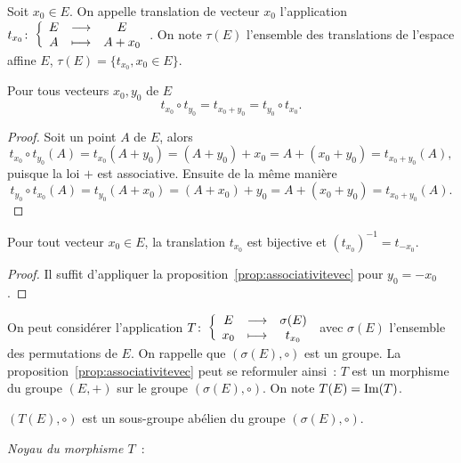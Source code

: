 \begin{defdef}
  Soit $x_0 \in E$. On appelle translation de vecteur $x_0$ l'application $t_{x_0}\colon \left\{\begin{array}{ccc} E & \longrightarrow &E\\ A & \longmapsto & A+x_0 \end{array} \right.$. On note $\tau(E)$ l'ensemble des translations de l'espace affine $E$, $\tau(E)=\{t_{x_0}, x_0 \in E\}$.
\end{defdef}

\begin{prop}\label{prop:associativitevec}
  Pour tous vecteurs $x_0, y_0$ de $E$
  \begin{equation}
    t_{x_0} \circ t_{y_0} = t_{x_0 +y_0} = t_{y_0} \circ t_{x_0}.
  \end{equation}
\end{prop}
\begin{proof}
  Soit un point $A$ de $E$, alors
  \begin{equation}
    t_{x_0} \circ t_{y_0} (A)=t_{x_0}(A+y_0) = (A+y_0)+x_0 = A+(x_0+y_0) =t_{x_0+y_0}(A),
  \end{equation}
  puisque la loi $+$ est associative. Ensuite de la même manière
  \begin{equation}
    t_{y_0} \circ t_{x_0} (A)=t_{y_0}(A+x_0) = (A+x_0)+y_0 = A+(x_0+y_0)=t_{x_0+y_0}(A).
  \end{equation}
\end{proof}

\begin{prop}
  Pour tout vecteur $x_0 \in E$, la translation $t_{x_0}$ est bijective et $(t_{x_0})^{-1}=t_{-x_0}$.
\end{prop}
\begin{proof}
  Il suffit d'appliquer la proposition~\ref{prop:associativitevec} pour $y_0=-x_0$.
\end{proof}

On peut considérer l'application $T\colon \left\{\begin{array}{ccc} E & \longrightarrow &\sigma(E)\\ x_0 & \longmapsto & t_{x_0} \end{array} \right.$ avec $\sigma(E)$ l'ensemble des permutations de $E$. On rappelle que $(\sigma(E),\circ)$ est un groupe. La proposition~\ref{prop:associativitevec} peut se reformuler ainsi~: $T$ est un morphisme du groupe $(E,+)$ sur le groupe $(\sigma(E),\circ)$. On note $T(E)=\operatorname{Im}(T)$.

\begin{prop}
  $(T(E),\circ)$ est un sous-groupe abélien du groupe $(\sigma(E),\circ)$.
\end{prop}

\emph{Noyau du morphisme $T$}~:

